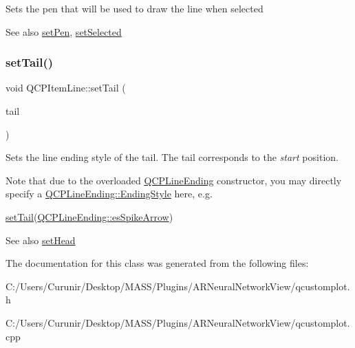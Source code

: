 Sets the pen that will be used to draw the line when selected

\begin{DoxySeeAlso}{See also}
\hyperlink{class_q_c_p_item_line_a572528dab61c1abe205822fbd5db4b27}{set\+Pen}, \hyperlink{class_q_c_p_abstract_item_a203de94ad586cc44d16c9565f49d3378}{set\+Selected} 
\end{DoxySeeAlso}
\mbox{\label{class_q_c_p_item_line_ac264222c3297a7efe33df9345c811a5f}} 
\subsubsection{\texorpdfstring{set\+Tail()}{setTail()}}
{\footnotesize\ttfamily void Q\+C\+P\+Item\+Line\+::set\+Tail (\begin{DoxyParamCaption}\item[{const \hyperlink{class_q_c_p_line_ending}{Q\+C\+P\+Line\+Ending} \&}]{tail }\end{DoxyParamCaption})}

Sets the line ending style of the tail. The tail corresponds to the {\itshape start} position.

Note that due to the overloaded \hyperlink{class_q_c_p_line_ending}{Q\+C\+P\+Line\+Ending} constructor, you may directly specify a \hyperlink{class_q_c_p_line_ending_a5ef16e6876b4b74959c7261d8d4c2cd5}{Q\+C\+P\+Line\+Ending\+::\+Ending\+Style} here, e.\+g.
\begin{DoxyCode}
\hyperlink{class_q_c_p_item_line_ac264222c3297a7efe33df9345c811a5f}{setTail}(\hyperlink{class_q_c_p_line_ending_a5ef16e6876b4b74959c7261d8d4c2cd5a814748a589d8bf2a0b6bf8ed4a6a5376}{QCPLineEnding::esSpikeArrow}) 
\end{DoxyCode}


\begin{DoxySeeAlso}{See also}
\hyperlink{class_q_c_p_item_line_aebf3d687114d584e0459db6759e2c3c3}{set\+Head} 
\end{DoxySeeAlso}


The documentation for this class was generated from the following files\+:\begin{DoxyCompactItemize}
\item 
C\+:/\+Users/\+Curunir/\+Desktop/\+M\+A\+S\+S/\+Plugins/\+A\+R\+Neural\+Network\+View/qcustomplot.\+h\item 
C\+:/\+Users/\+Curunir/\+Desktop/\+M\+A\+S\+S/\+Plugins/\+A\+R\+Neural\+Network\+View/qcustomplot.\+cpp\end{DoxyCompactItemize}
